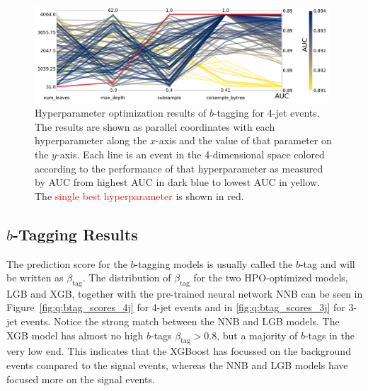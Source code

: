 \begin{figure}
  \includegraphics[width=0.98\textwidth, trim=0 0 0 0, clip]{figures/quarks/CV_viz-njet=4-name=lf_lgb_down_sample=1.00-ML_vars=vertex-selection=b-ejet_min=4-n_iter_RS_lgb=99-n_iter_RS_xgb=9-cdot_cut=0.90-version=19.pdf}
  \caption[Parallel Plot of HPO Results for 4-Jet $b$-Tagging]
          {Hyperparameter optimization results of $b$-tagging for 4-jet events. The results are shown as parallel coordinates with each hyperparameter along the $x$-axis and the value of that parameter on the $y$-axis. Each line is an event in the 4-dimensional space colored according to the performance of that hyperparameter as measured by AUC from \textcolor{viridis-dark}{highest} AUC in dark blue to \textcolor{viridis-light}{lowest} AUC in yellow. The \textcolor{red}{single best hyperparameter} is shown in red. 
          } 
  \label{fig:q:initial_CV_res_parallel_coords_4j}
\end{figure}

\subsection{$b$-Tagging Results}

The prediction score for the $b$-tagging models is usually called the $b$-tag and will be written as $\beta_\mathrm{tag}$. The distribution of $\beta_\mathrm{tag}$ for the two HPO-optimized models, LGB and XGB, together with the pre-trained neural network NNB can be seen in Figure~\ref{fig:q:btag_scores_4j} for 4-jet events and in \ref{fig:q:btag_scores_3j} for 3-jet events. Notice the strong match between the NNB and LGB models. The XGB model has almost no high $b$-tags $\beta_\mathrm{tag} > 0.8$, but a majority of $b$-tags in the very low end. This indicates that the XGBoost has focussed on the background events compared to the signal events, whereas the NNB and LGB models have focused more on the signal events. 

